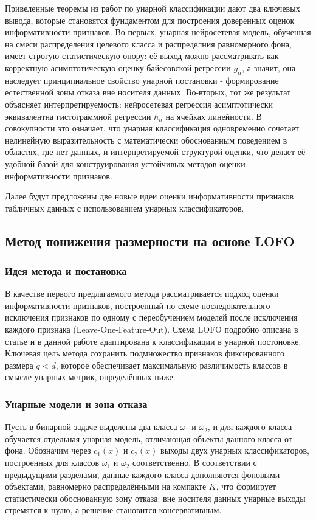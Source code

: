 \documentclass[12pt,a4paper]{article}
\begin{document}
Привеленные теоремы из работ по унарной классификации дают два ключевых вывода, которые становятся фундаментом для построения
доверенных оценок информативности признаков. Во-первых, унарная нейросетевая модель,
обученная на смеси распределения целевого класса и распределния равномерного фона, имеет строгую статистическую опору:
её выход можно рассматривать как корректную асимптотическую оценку байесовской регрессии
$g_\alpha$, а значит, она наследует принципиальное свойство унарной постановки - формирование
естественной зоны отказа вне носителя данных.
Во-вторых, тот же результат объясняет интерпретируемость: нейросетевая регрессия
асимптотически эквивалентна гистограммной регрессии $h_n$ на ячейках линейности. В совокупности это означает, что
унарная классификация одновременно сочетает нелинейную выразительность с математически
обоснованным поведением в областях, где нет данных, и интерпретируемой структурой оценки, что делает
её удобной базой для конструирования устойчивых методов оценки информативности признаков.

Далее будут предложены две новые идеи оценки информативности 
признаков табличных данных с использованием унарных классификаторов.

\subsection{Метод понижения размерности на основе LOFO}

\subsubsection{Идея метода и постановка}
В качестве первого предлагаемого метода рассматривается подход оценки информативности признаков,
построенный по схеме последовательного исключения признаков по одному с переобучением моделей после исключения каждого признака (Leave-One-Feature-Out).
Схема LOFO подробно описана в статье \cite{liu2013lofo} и в данной работе 
адаптирована к классификации в унарной постоновке.
Ключевая цель метода сохранить подмножество признаков фиксированного размера $q<d$,
которое обеспечивает максимальную различимость классов в смысле унарных метрик, определённых ниже.

\subsubsection{Унарные модели и зона отказа}
Пусть в бинарной задаче выделены два класса $\omega_1$ и $\omega_2$, и для каждого класса обучается
отдельная унарная модель, отличающая объекты данного класса от фона.
Обозначим через $c_1(x)$ и $c_2(x)$ выходы двух унарных классификаторов, построенных для классов
$\omega_1$ и $\omega_2$ соответственно. В соответствии с предыдущими разделами, данные каждого класса
дополняются фоновыми объектами, равномерно распределёнными на компакте $K$, что формирует
статистически обоснованную зону отказа: вне носителя данных унарные выходы стремятся к нулю,
а решение становится консервативным.
\end{document}
